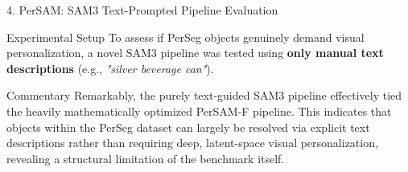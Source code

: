 \documentclass[aspectratio=169, 10pt]{beamer}
\begin{document}
\begin{frame}{4. PerSAM: SAM3 Text-Prompted Pipeline Evaluation}
    \begin{block}{Experimental Setup}
        To assess if PerSeg objects genuinely demand visual personalization, a novel SAM3 pipeline was tested using \textbf{only manual text descriptions} (e.g., \textit{"silver beverage can"}).
    \end{block}

    \begin{table}[htbp]
    \centering
    \caption{Aggregated Comparison: SAM3 vs PerSAM Frameworks}
    \end{table}
    
    \begin{alertblock}{Commentary}
        \footnotesize Remarkably, the purely text-guided SAM3 pipeline effectively tied the heavily mathematically optimized PerSAM-F pipeline. This indicates that objects within the PerSeg dataset can largely be resolved via explicit text descriptions rather than requiring deep, latent-space visual personalization, revealing a structural limitation of the benchmark itself.
    \end{alertblock}
\end{frame}
\end{document}

